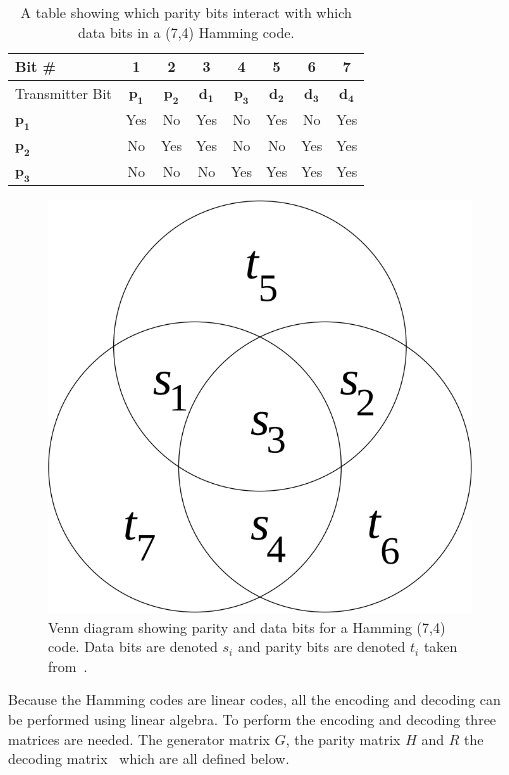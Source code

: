 \documentclass[12pt,onecolumn,letterpaper]{article}
\begin{document}
\begin{table}[H]
   \begin{center}
   \begin{tabular}{|l|c|c|c|c|c|c|c|}
   \hline
   Bit \# & 1 & 2 & 3 & 4 & 5 & 6 & 7 \\
   \hline\hline
   Transmitter Bit & $\mathbf{p_1}$ & $\mathbf{p_2}$ & $\mathbf{d_1}$ & $\mathbf{p_3}$ & $\mathbf{d_2}$ & $\mathbf{d_3}$ & $\mathbf{d_4}$ \\
   \hline
   $\mathbf{p_1}$ & \cellcolor{green}Yes & \cellcolor{red}No & \cellcolor{green}Yes & \cellcolor{red}No & \cellcolor{green}Yes & \cellcolor{red}No & \cellcolor{green}Yes \\
   $\mathbf{p_2}$ & \cellcolor{red}No & \cellcolor{green}Yes & \cellcolor{green}Yes & \cellcolor{red}No & \cellcolor{red}No & \cellcolor{green}Yes & \cellcolor{green}Yes \\
   $\mathbf{p_3}$ & \cellcolor{red}No & \cellcolor{red}No & \cellcolor{red}No & \cellcolor{green}Yes & \cellcolor{green}Yes & \cellcolor{green}Yes & \cellcolor{green}Yes \\
   \hline
   \end{tabular}
   \end{center}
   \caption{A table showing which parity bits interact with which data bits in a (7,4) Hamming code.}
   \label{tab:Hamming74Parity}
   \end{table}
   

\begin{figure}
   \centering
   \includegraphics[width=0.2\linewidth]{figures/hamming_parity_venn_diagram.png}
   \caption{Venn diagram showing parity and data bits for a Hamming (7,4) code. Data bits are denoted $s_i$ and parity bits are denoted $t_i$ taken from~\cite{HammingMoonBook}.}
   \label{fig:HammingParityVennDiagram}
\end{figure}

Because the Hamming codes are linear codes, all the encoding and decoding can be performed using linear algebra. To perform the encoding and decoding three matrices are needed. The generator matrix $G$, the parity matrix $H$ and $R$ the decoding matrix~\cite{HammingMoonBook} which are all defined below.
\end{document}

